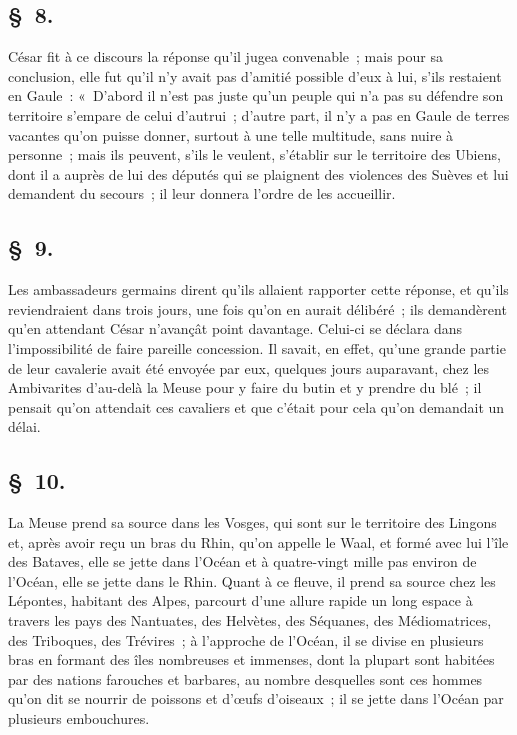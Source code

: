 \documentclass[french,twoside]{book} %
\begin{document}
\subsection[{§ 8.}]{ \textsc{§ 8.} }
\noindent César fit à ce discours la réponse qu’il jugea convenable ; mais pour sa conclusion, elle fut qu’il n’y avait pas d’amitié possible d’eux à lui, s’ils restaient en Gaule : « D'abord il n’est pas juste qu’un peuple qui n’a pas su défendre son territoire s’empare de celui d’autrui ; d’autre part, il n’y a pas en Gaule de terres vacantes qu’on puisse donner, surtout à une telle multitude, sans nuire à personne ; mais ils peuvent, s’ils le veulent, s’établir sur le territoire des Ubiens, dont il a auprès de lui des députés qui se plaignent des violences des Suèves et lui demandent du secours ; il leur donnera l’ordre de les accueillir.
\subsection[{§ 9.}]{ \textsc{§ 9.} }
\noindent Les ambassadeurs germains dirent qu’ils allaient rapporter cette réponse, et qu’ils reviendraient dans trois jours, une fois qu’on en aurait délibéré ; ils demandèrent qu’en attendant César n’avançât point davantage. Celui-ci se déclara dans l’impossibilité de faire pareille concession. Il savait, en effet, qu’une grande partie de leur cavalerie avait été envoyée par eux, quelques jours auparavant, chez les Ambivarites d’au-delà la Meuse pour y faire du butin et y prendre du blé ; il pensait qu’on attendait ces cavaliers et que c’était pour cela qu’on demandait un délai.
\subsection[{§ 10.}]{ \textsc{§ 10.} }
\noindent La Meuse prend sa source dans les Vosges, qui sont sur le territoire des Lingons et, après avoir reçu un bras du Rhin, qu’on appelle le Waal, et formé avec lui l’île des Bataves, elle se jette dans l’Océan et à quatre-vingt mille pas environ de l’Océan, elle se jette dans le Rhin. Quant à ce fleuve, il prend sa source chez les Lépontes, habitant des Alpes, parcourt d’une allure rapide un long espace à travers les pays des Nantuates, des Helvètes, des Séquanes, des Médiomatrices, des Triboques, des Trévires ; à l’approche de l’Océan, il se divise en plusieurs bras en formant des îles nombreuses et immenses, dont la plupart sont habitées par des nations farouches et barbares, au nombre desquelles sont ces hommes qu’on dit se nourrir de poissons et d’œufs d’oiseaux ; il se jette dans l’Océan par plusieurs embouchures.
\end{document}
